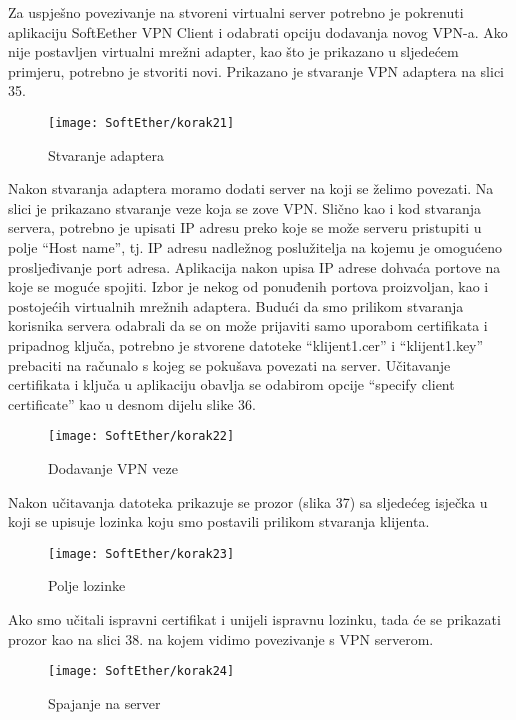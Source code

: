 \hfill \smallbreak
Za uspješno povezivanje na stvoreni virtualni server potrebno je pokrenuti aplikaciju SoftEether VPN Client i odabrati opciju dodavanja novog VPN-a. Ako nije postavljen virtualni mrežni adapter, kao što je prikazano u sljedećem primjeru, potrebno je stvoriti novi. Prikazano je stvaranje VPN adaptera na slici 35.
\begin{figure}[h!]
     \centering
     \texttt{[image: SoftEther/korak21]}
     \caption{Stvaranje adaptera}
\end{figure}
\FloatBarrier
Nakon stvaranja adaptera moramo dodati server na koji se želimo povezati. Na slici je prikazano stvaranje veze koja se zove VPN. Slično kao i kod stvaranja servera, potrebno je upisati IP adresu preko koje se može serveru pristupiti u polje ``Host name'', tj. IP adresu nadležnog poslužitelja na kojemu je omogućeno prosljeđivanje port adresa. Aplikacija nakon upisa IP adrese dohvaća portove na koje se moguće spojiti. Izbor je nekog od ponuđenih portova proizvoljan, kao i postojećih virtualnih mrežnih adaptera. Budući da smo prilikom stvaranja korisnika servera odabrali da se on može prijaviti samo uporabom certifikata i pripadnog ključa, potrebno je stvorene datoteke ``klijent1.cer'' i ``klijent1.key'' prebaciti na računalo s kojeg se pokušava povezati na server. Učitavanje certifikata i ključa u aplikaciju obavlja se odabirom opcije ``specify client certificate'' kao u desnom dijelu slike 36.
\begin{figure}[h!]
     \centering
     \texttt{[image: SoftEther/korak22]}
     \caption{Dodavanje VPN veze}
\end{figure}
\FloatBarrier
Nakon učitavanja datoteka prikazuje se prozor (slika 37) sa sljedećeg isječka u koji se upisuje lozinka koju smo postavili prilikom stvaranja klijenta.
\begin{figure}[h!]
     \centering
     \texttt{[image: SoftEther/korak23]}
     \caption{Polje lozinke}
\end{figure}
\FloatBarrier
Ako smo učitali ispravni certifikat i unijeli ispravnu lozinku, tada će se prikazati prozor kao na slici 38. na kojem vidimo povezivanje s VPN serverom.
\begin{figure}[h!]
     \centering
     \texttt{[image: SoftEther/korak24]}
     \caption{Spajanje na server}
\end{figure}
\FloatBarrier

